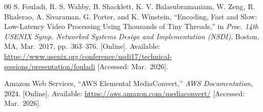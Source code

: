 \documentclass[conference]{IEEEtran}
\begin{document}
\begin{thebibliography}{00}
 S. Fouladi, R. S. Wahby, B. Shacklett, K. V. Balasubramaniam,
W. Zeng, R. Bhalerao, A. Sivaraman, G. Porter, and K. Winstein,
``Encoding, Fast and Slow: Low-Latency Video Processing Using Thousands
of Tiny Threads,'' in \emph{Proc. 14th USENIX Symp. Networked Systems
Design and Implementation (NSDI)}, Boston, MA, Mar.\ 2017, pp.\ 363--376.
[Online]. Available: \url{https://www.usenix.org/conference/nsdi17/technical-sessions/presentation/fouladi}
[Accessed: Mar.\ 2026].

 Amazon Web Services, ``AWS Elemental MediaConvert,''
\emph{AWS Documentation}, 2024. [Online]. Available:
\url{https://aws.amazon.com/mediaconvert/}
[Accessed: Mar.\ 2026].

\end{thebibliography}
\end{document}
